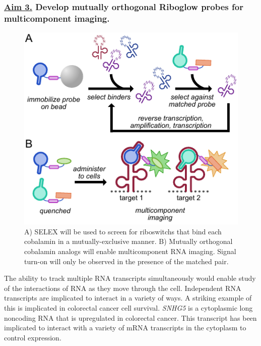 \subsubsection*{\underline{Aim 3.} Develop mutually orthogonal Riboglow probes for multicomponent imaging.}
\begin{figure}
\begin{centering}
\includegraphics[width=\textwidth]{figures/aim3v2.pdf}
\end{centering}
\footnotesize
\caption{\label{figure:aim3}
A) SELEX will be used to screen for riboswitchs that bind each cobalamin in a mutually-exclusive manner. B) Mutually orthogonal cobalamin analogs will enable multicomponent RNA imaging. Signal turn-on will only be observed in the presence of the matched pair.
}
\end{figure}
The ability to track multiple RNA transcripts simultaneously would enable study of the interactions of RNA as they move through the cell. Independent RNA transcripts are implicated to interact in a variety of ways. A striking example of this is implicated in colorectal cancer cell survival\cite{DamasSNHG5promotescolorectal2016}. \textit{SNHG5} is a cytoplasmic long noncoding RNA that is upregulated in colorectal cancer. This transcript has been implicated to interact with a variety of mRNA transcripts in the cytoplasm to control expression.
